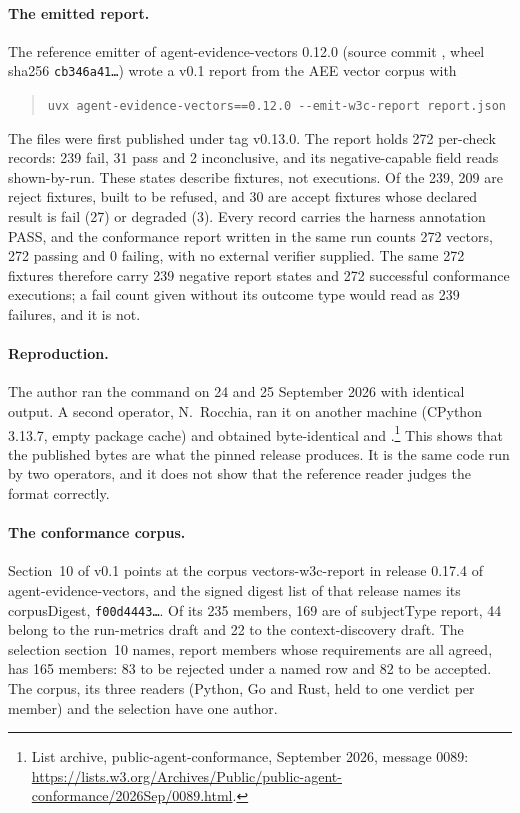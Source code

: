 \paragraph{The emitted report.}
The reference emitter of agent-evidence-vectors 0.12.0 (source commit
, wheel sha256 \texttt{cb346a41\ldots}) wrote a v0.1 report from
the AEE vector corpus with
\begin{quote}\footnotesize
\verb|uvx agent-evidence-vectors==0.12.0 --emit-w3c-report report.json|
\end{quote}
\noindent
The files were first published under tag v0.13.0. The report holds 272 per-check
records: 239 fail, 31 pass and 2 inconclusive, and its negative-capable field
reads shown-by-run. These states describe fixtures, not executions. Of the 239,
209 are reject fixtures, built to be refused, and 30 are accept fixtures whose
declared result is fail (27) or degraded (3). Every record carries the harness
annotation PASS, and the conformance report written in the same run counts 272
vectors, 272 passing and 0 failing, with no external verifier supplied. The same
272 fixtures therefore carry 239 negative report states and 272 successful
conformance executions; a fail count given without its outcome type would read as
239 failures, and it is not.

\paragraph{Reproduction.}
The author ran the command on 24 and 25 September 2026 with identical output. A
second operator, N.~Rocchia, ran it on another machine (CPython 3.13.7, empty
package cache) and obtained byte-identical  and
.\footnote{List archive, public-agent-conformance, September 2026, message 0089: \url{https://lists.w3.org/Archives/Public/public-agent-conformance/2026Sep/0089.html}.} This shows that the
published bytes are what the pinned release produces. It is the same code run
by two operators, and it does not show that the reference reader judges the
format correctly.

\paragraph{The conformance corpus.}
Section~10 of v0.1 points at the corpus vectors-w3c-report in release 0.17.4
of agent-evidence-vectors, and the signed digest list of that release names its
corpusDigest, \texttt{f00d4443\ldots}. Of its 235
members, 169 are of subjectType report, 44 belong to the run-metrics draft and 22
to the context-discovery draft. The selection section~10 names, report members
whose requirements are all agreed, has 165 members: 83 to be rejected under a
named row and 82 to be accepted. The corpus, its three readers (Python, Go and
Rust, held to one verdict per member) and the selection have one author.


